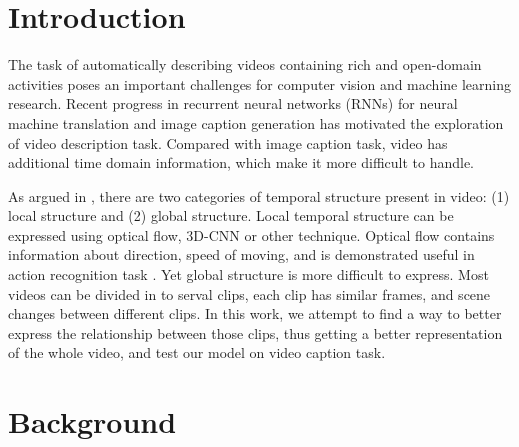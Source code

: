 



\tableofcontents
\clearpage

\begin{abstract}

\end{abstract}

\section{Introduction}
The task of automatically describing videos containing rich and open-domain activities poses an important challenges for computer vision and machine learning research. Recent progress in recurrent neural networks (RNNs) for neural machine translation and image caption generation has motivated the exploration of video description task. Compared with image caption task, video has additional time domain information, which make it more difficult to handle.

As argued in \cite{yao2015describing}, there are two categories of temporal structure present in video: (1) local structure and (2) global structure. Local temporal structure can be expressed using optical flow, 3D-CNN \cite{tran2014c3d} or other technique. Optical flow contains information about direction, speed of moving, and is demonstrated useful in action recognition task \cite{simonyan2014two}. Yet global structure is more difficult to express. Most videos can be divided in to serval clips, each clip has similar frames, and scene changes between different clips. In this work, we attempt to find a way to better express the relationship between those clips, thus getting a better representation of the whole video, and test our model on video caption task.

\section{Background}
